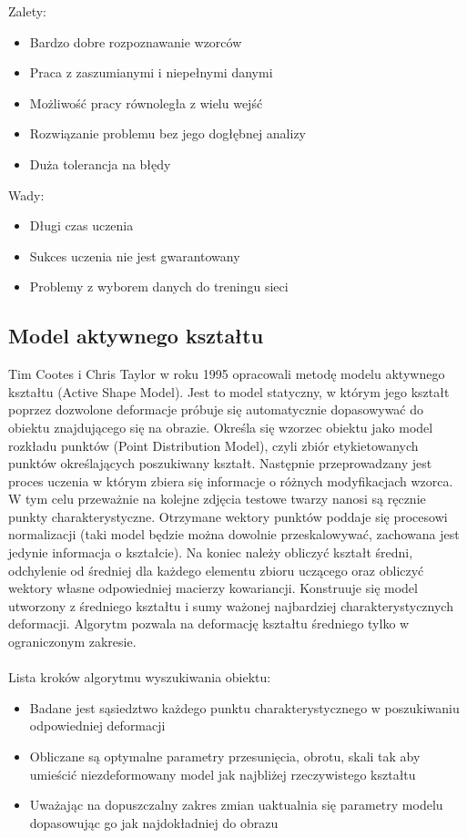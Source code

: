 \documentclass[11pt,a4paper]{article}
\begin{document}
\noindent 
Zalety:
\begin{itemize}
\item  Bardzo dobre rozpoznawanie wzorców
\item  Praca z zaszumianymi i niepełnymi danymi
\item  Możliwość pracy równoległa z wielu wejść
\item  Rozwiązanie problemu bez jego dogłębnej analizy
\item  Duża tolerancja na błędy
\end{itemize}

\noindent 
Wady:
\begin{itemize}
\item  Długi czas uczenia 
\item  Sukces uczenia nie jest gwarantowany 
\item  Problemy z wyborem danych do treningu sieci 
\end{itemize}

\subsection{Model aktywnego kształtu}
Tim Cootes i Chris Taylor w roku 1995 opracowali metodę modelu aktywnego kształtu (Active Shape Model)\cite{SMIA001}. Jest to model statyczny, w którym jego kształt poprzez dozwolone deformacje próbuje się automatycznie dopasowywać do obiektu znajdującego się na obrazie. Określa się wzorzec obiektu jako model rozkładu punktów (Point Distribution Model), czyli zbiór etykietowanych punktów określających poszukiwany kształt. Następnie przeprowadzany jest proces uczenia w którym zbiera się informacje o różnych modyfikacjach wzorca. W tym celu przeważnie na kolejne zdjęcia testowe twarzy nanosi są ręcznie punkty charakterystyczne. Otrzymane wektory punktów poddaje się procesowi normalizacji (taki model będzie można dowolnie przeskalowywać, zachowana jest jedynie informacja o kształcie). Na koniec należy obliczyć kształt średni, odchylenie od średniej dla każdego elementu zbioru uczącego oraz obliczyć wektory własne odpowiedniej macierzy kowariancji. Konstruuje się model utworzony z średniego kształtu i sumy ważonej najbardziej charakterystycznych deformacji. Algorytm pozwala na deformację kształtu średniego tylko w ograniczonym zakresie.\\
\\
\noindent
Lista kroków algorytmu wyszukiwania obiektu:
\begin{itemize}
\item Badane jest sąsiedztwo każdego punktu charakterystycznego w poszukiwaniu odpowiedniej deformacji
\item Obliczane są optymalne parametry przesunięcia, obrotu, skali tak aby umieścić niezdeformowany model jak najbliżej rzeczywistego kształtu
\item Uważając na dopuszczalny zakres zmian uaktualnia się parametry modelu dopasowując go jak najdokładniej do obrazu
\end{itemize}
\end{document}
